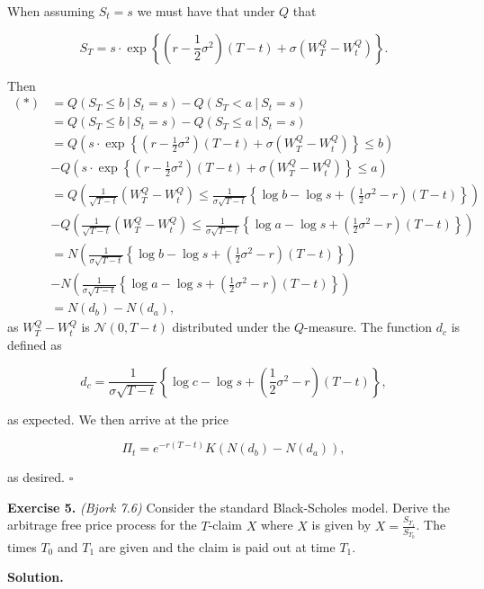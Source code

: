\documentclass[a4paper,12pt,openany]{book}
\begin{document}
When assuming \(S_t=s\) we must have that under \(Q\) that

\[
S_T=s\cdot \exp\left\{\left(r-\frac{1}{2}\sigma ^2\right)(T-t)+\sigma\left(W_T^Q-W_t^Q\right)\right\}.
\]

Then
\begin{align*}
(*)&=Q(S_T\le b\ \vert\ S_t=s)-Q(S_T<a\ \vert\ S_t=s)\\
&=Q(S_T\le b\ \vert\ S_t=s)-Q(S_T\le a\ \vert\ S_t=s)\\
&=Q\left(s\cdot \exp\left\{\left(r-\frac{1}{2}\sigma ^2\right)(T-t)+\sigma\left(W_T^Q-W_t^Q\right)\right\}\le b\right)\\
&-Q\left(s\cdot \exp\left\{\left(r-\frac{1}{2}\sigma ^2\right)(T-t)+\sigma\left(W_T^Q-W_t^Q\right)\right\}\le a\right)\\
&=Q\left(\frac{1}{\sqrt{T-t}}\left(W_T^Q-W_t^Q\right)\le\frac{1}{\sigma\sqrt{T-t}}\left\{\log b-\log s+\left(\frac{1}{2}\sigma ^2-r\right)(T-t)\right\}\right)\\
&-Q\left(\frac{1}{\sqrt{T-t}}\left(W_T^Q-W_t^Q\right)\le\frac{1}{\sigma\sqrt{T-t}}\left\{\log a-\log s+\left(\frac{1}{2}\sigma ^2-r\right)(T-t)\right\}\right)\\
&=N\left(\frac{1}{\sigma\sqrt{T-t}}\left\{\log b-\log s+\left(\frac{1}{2}\sigma ^2-r\right)(T-t)\right\}\right)\\
&-N\left(\frac{1}{\sigma\sqrt{T-t}}\left\{\log a-\log s+\left(\frac{1}{2}\sigma ^2-r\right)(T-t)\right\}\right)\\
&=N(d_b)-N(d_a),
\end{align*}
as \(W_T^Q-W_t^Q\) is \(\mathcal{N}(0,T-t)\) distributed under the \(Q\)-measure. The function \(d_c\) is defined as

\[
d_c=\frac{1}{\sigma\sqrt{T-t}}\left\{\log c-\log s+\left(\frac{1}{2}\sigma ^2-r\right)(T-t)\right\},
\]

as expected. We then arrive at the price

\[
\Pi_t=e^{-r(T-t)}K(N(d_b)-N(d_a)),
\]

as desired. \(\square\)

\textbf{Exercise 5.} \emph{(Bjork 7.6)} Consider the standard Black-Scholes model. Derive the arbitrage free price process for the \(T\)-claim \(X\) where \(X\) is given by \(X=\frac{S_{T_1}}{S_{T_0}}\). The times \(T_0\) and \(T_1\) are given and the claim is paid out at time \(T_1\).

\textbf{Solution.}
\end{document}
